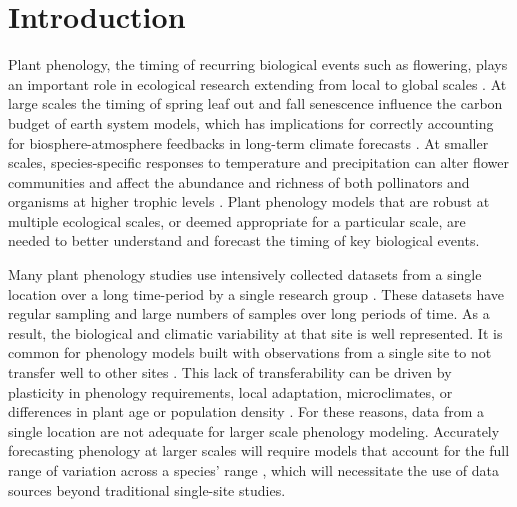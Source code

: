 \documentclass[fleqn,12pt,lineno]{article}
\begin{document}


\newpage
\section*{Introduction}

Plant phenology, the timing of recurring biological events such as flowering, plays an important role in ecological research extending from local to global scales \citep{cleland2007, richardson2013, tang2016}. At large scales the timing of spring leaf out and fall senescence influence the carbon budget of earth system models, which has implications for correctly accounting for biosphere-atmosphere feedbacks in long-term climate forecasts \citep{richardson2012}. At smaller scales, species-specific responses to temperature and precipitation can alter flower communities \citep{diez2012, caradonna2014, theobald2017} and affect the abundance and richness of both pollinators \citep{ogilvie2017a, ogilvie2017b} and organisms at higher trophic levels \citep{tylianakis2008}. Plant phenology models that are robust at multiple ecological scales, or deemed appropriate for a particular scale, are needed to better understand and forecast the timing of key biological events.

Many plant phenology studies use intensively collected datasets from a single location over a long time-period by a single research group \citep{cook2012, wolkovich2012, iler2013, roberts2015}. These datasets have regular sampling and large numbers of samples over long periods of time. As a result, the biological and climatic variability at that site is well represented. It is common for phenology models built with observations from a single site to not transfer well to other sites \citep{garcia-mozo2008, xu2013, olsson2014, basler2016}. This lack of transferability can be driven by plasticity in phenology requirements, local adaptation, microclimates, or differences in plant age or population density \citep{kramer1995, diez2012}. For these reasons, data from a single location are not adequate for larger scale phenology modeling. Accurately forecasting phenology at larger scales will require models that account for the full range of variation across a species' range \citep{richardson2013, tang2016, chuine2017}, which will necessitate the use of data sources beyond traditional single-site studies.
\end{document}

